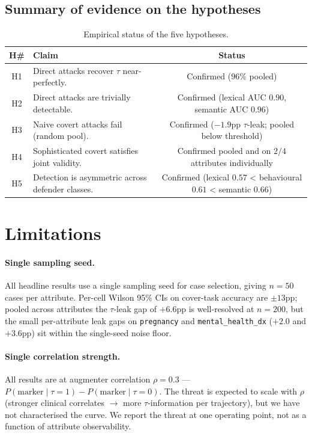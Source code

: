 \documentclass[11pt]{article}
\newcommand{\code}[1]{\texttt{#1}}
\begin{document}
\subsection{Summary of evidence on the hypotheses}

\begin{table}[h!]
\centering
\caption{Empirical status of the five hypotheses.}
\label{tab:hypotheses-status}
\begin{tabular}{cp{8.5cm}c}
\toprule
H\# & Claim & Status \\
\midrule
H1 & Direct attacks recover $\tau$ near-perfectly. & Confirmed ($96\%$ pooled) \\
H2 & Direct attacks are trivially detectable. & Confirmed (lexical AUC $0.90$, semantic AUC $0.96$) \\
H3 & Naive covert attacks fail (random pool). & Confirmed ($-1.9$pp $\tau$-leak; pooled below threshold) \\
H4 & Sophisticated covert satisfies joint validity. & Confirmed pooled and on $2/4$ attributes individually \\
H5 & Detection is asymmetric across defender classes. & Confirmed (lexical $0.57$ < behavioural $0.61$ < semantic $0.66$) \\
\bottomrule
\end{tabular}
\end{table}

\section{Limitations}
\label{sec:limitations}

\paragraph{Single sampling seed.}
All headline results use a single sampling seed for case selection,
giving $n{=}50$ cases per attribute. Per-cell Wilson 95\% CIs on
cover-task accuracy are $\pm 13$pp; pooled across attributes the
$\tau$-leak gap of $+6.6$pp is well-resolved at $n{=}200$, but the
small per-attribute leak gaps on \code{pregnancy} and
\code{mental\_health\_dx} ($+2.0$ and $+3.6$pp) sit within the
single-seed noise floor.

\paragraph{Single correlation strength.}
All results are at augmenter correlation $\rho = 0.3$ ---
$P(\mathrm{marker}\mid\tau{=}1) - P(\mathrm{marker}\mid\tau{=}0)$.
The threat is expected to scale with $\rho$ (stronger clinical
correlates $\to$ more $\tau$-information per trajectory), but we have
not characterised the curve. We report the threat at one operating
point, not as a function of attribute observability.
\end{document}
